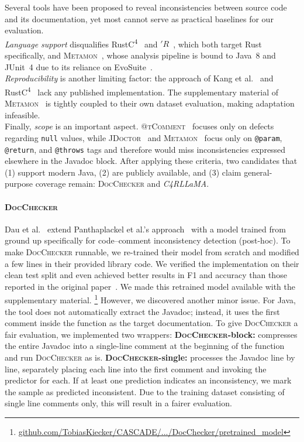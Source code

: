 \documentclass[acmsmall, screen]{acmart}
\begin{document}
Several tools have been proposed to reveal inconsistencies between source code and its documentation, yet most cannot serve as practical baselines for our evaluation.
\\\textit{Language support} disqualifies RustC\textsuperscript{4}~\cite{rustc4} and $'R$~\cite{inconR}, which both target Rust specifically, and \textsc{Metamon}~\cite{metamon}, whose analysis pipeline is bound to Java~8 and JUnit~4 due to its reliance on EvoSuite~\cite{evosuite}.
\\\textit{Reproducibility} is another limiting factor: the approach of Kang et al.~\cite{sungmin} and RustC\textsuperscript{4}~\cite{rustc4} lack any published implementation. The supplementary material of \textsc{Metamon}~\cite{metamon} is tightly coupled to their own dataset evaluation, making adaptation infeasible.
\\Finally, \textit{scope} is an important aspect. \textsc{@tComment}~\cite{tan2012tcomment} focuses only on defects regarding \texttt{null} values, while \textsc{JDoctor}~\cite{jdoctor} and \textsc{Metamon}~\cite{metamon} focus only on \texttt{@param}, \texttt{@return}, and \texttt{@throws} tags and therefore would miss inconsistencies expressed elsewhere in the Javadoc block.
After applying these criteria, two candidates that (1) support modern Java, (2) are publicly available, and (3) claim general-purpose coverage remain: \textsc{DocChecker} and \textit{C4RLLaMA}.

\paragraph{\textsc{DocChecker}}
Dau et al.~\cite{docchecker} extend Panthaplackel et al.'s approach~\cite{panthaplackel2021deep} with a model trained from ground up specifically for code–comment inconsistency detection (post-hoc). To make \textsc{DocChecker} runnable, we re-trained their model from scratch and modified a few lines in their provided library code. 
We verified the implementation on their clean test split and even achieved better results in F1 and accuracy than those reported in the original paper~\cite{docchecker}. We made this retrained model available with the supplementary material.
\footnote{\href{https://github.com/TobiasKiecker/CASCADE/blob/FSE2026-v1.0.0/PaperEvaluation/drivers/DocChecker/pretrained_model/README.md}{github.com/TobiasKiecker/CASCADE/.../DocChecker/pretrained\_model}}
However, we discovered another minor issue. For Java, the tool does not automatically extract the Javadoc; instead, it uses the first comment inside the function as the target documentation. To give \textsc{DocChecker} a fair evaluation, we implemented two wrappers:
\textbf{\textsc{DocChecker}-block:} compresses the entire Javadoc into a single-line comment at the beginning of the function and run \textsc{DocChecker} as is.
\textbf{\textsc{DocChecker}-single:} processes the Javadoc line by line, separately placing each line into the first comment and invoking the predictor for each. If at least one prediction indicates an inconsistency, we mark the sample as predicted inconsistent.
Due to the training dataset consisting of single line comments only, this will result in a fairer evaluation.
\end{document}
